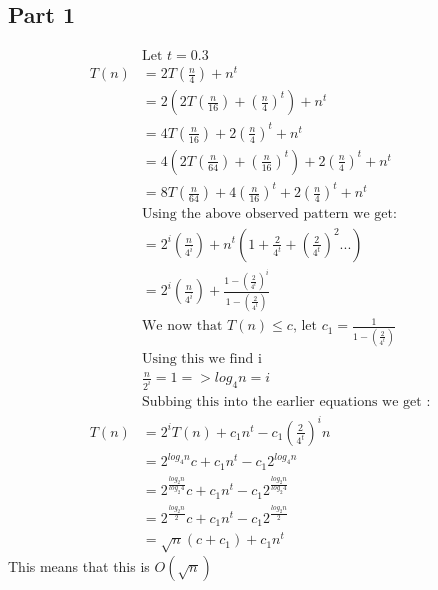 \documentclass{article}
\begin{document}
    \subsection{Part 1}
        \begin{align*}
            &\textrm{Let $t = 0.3$}\\
            T(n) &= 2T(\frac{n}{4}) + n^t\\
            &= 2(2T(\frac{n}{16}) + (\frac{n}{4})^t) + n^t\\
            &= 4T(\frac{n}{16}) + 2(\frac{n}{4})^t + n^t\\
            &= 4(2T(\frac{n}{64}) + (\frac{n}{16})^t) + 2(\frac{n}{4})^t + n^t\\
            &= 8T(\frac{n}{64}) + 4(\frac{n}{16})^t + 2(\frac{n}{4})^t + n^t\\
            &\textrm{Using the above observed pattern we get:}\\
            &= 2^i (\frac{n}{4^i}) + n^t(1 + \frac{2}{4^t} + (\frac{2}{4^t})^2 ...)\\
            &= 2^i (\frac{n}{4^i}) + \frac{1 - (\frac{2}{4^t})^i}{1 - (\frac{2}{4^t})}\\
            &\textrm{We now that $T(n) \leq c$, let $c_1 = \frac{1}{1 - (\frac{2}{4^t})}$}\\
            &\textrm{Using this we find i}\\
            &\frac{n}{2^i} = 1 => log_4 n = i\\
            &\textrm{Subbing this into the earlier equations we get :}\\
            T(n) &= 2^i T(n) + c_1 n^t - c_1 (\frac{2}{4^t})^i n\\
            &= 2^{log_4 n}c + c_1 n^{t} - c_1 2^{log_4 n}\\
            &= 2^{\frac{log_2 n}{log_2 4}}c + c_1 n^{t} - c_1 2^{\frac{log_2 n}{log_2 4}}\\
            &= 2^{\frac{log_2 n}{2}}c + c_1 n^{t} - c_1 2^{\frac{log_2 n}{2}}\\
            &= \sqrt{n}(c+c_1) + c_1 n^{t}
        \end{align*}
        This means that this is $O(\sqrt{n})$
\end{document}
